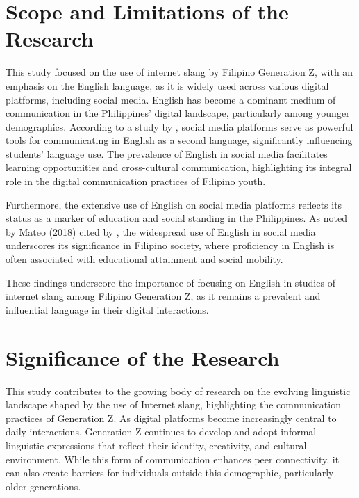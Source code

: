 \section{Scope and Limitations of the Research}
\label{sec:scope}
This study focused on the use of internet slang by Filipino Generation Z, with an emphasis on the English language, as it is widely used across various digital platforms, including social media. English has become a dominant medium of communication in the Philippines' digital landscape, particularly among younger demographics. According to a study by \cite{Olobia_2024}, social media platforms serve as powerful tools for communicating in English as a second language, significantly influencing students' language use. The prevalence of English in social media facilitates learning opportunities and cross-cultural communication, highlighting its integral role in the digital communication practices of Filipino youth.

Furthermore, the extensive use of English on social media platforms reflects its status as a marker of education and social standing in the Philippines. As noted by Mateo (2018) cited by \cite{Esquivel_2020}, the widespread use of English in social media underscores its significance in Filipino society, where proficiency in English is often associated with educational attainment and social mobility.

These findings underscore the importance of focusing on English in studies of internet slang among Filipino Generation Z, as it remains a prevalent and influential language in their digital interactions.

\section{Significance of the Research}
\label{sec:significance}
This study contributes to the growing body of research on the evolving linguistic landscape shaped by the use of Internet slang, highlighting the communication practices of Generation Z. As digital platforms become increasingly central to daily interactions, Generation Z continues to develop and adopt informal linguistic expressions that reflect their identity, creativity, and cultural environment. While this form of communication enhances peer connectivity, it can also create barriers for individuals outside this demographic, particularly older generations.

